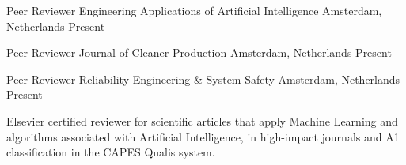 \begin{cvhonors}

  \cvhonor
    {Peer Reviewer} %
    {Engineering Applications of Artificial Intelligence} %
    {Amsterdam, Netherlands} %
    {Present} %

  \cvhonor
    {Peer Reviewer} %
    {Journal of Cleaner Production} %
    {Amsterdam, Netherlands} %
    {Present} %

  \cvhonor
    {Peer Reviewer} %
    {Reliability Engineering \& System Safety} %
    {Amsterdam, Netherlands} %
    {Present} %

\end{cvhonors}

\vspace{-2mm}
\begin{cvparagraph}
Elsevier certified reviewer for scientific articles that apply Machine Learning and algorithms associated with Artificial Intelligence, in high-impact journals and A1 classification in the CAPES Qualis system.
\end{cvparagraph} 